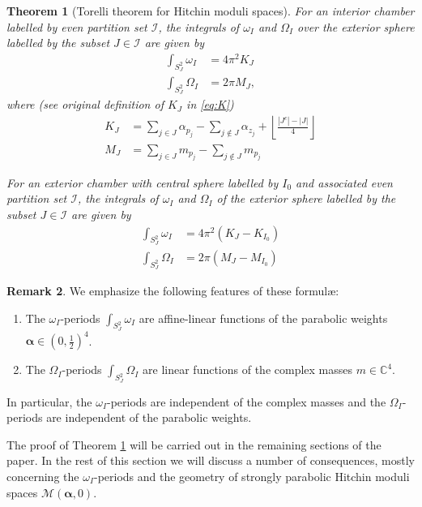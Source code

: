 \documentclass[12pt,letterpaper,reqno]{amsart}
\def\mathbf#1{#1}%
\newtheorem{thm}{Theorem}
\theoremstyle{remark}
\theoremstyle{definition}
\newtheorem{rem}[thm]{Remark}
\numberwithin{thm}{section}
\numberwithin{equation}{section}
\numberwithin{figure}{section}
\newcommand{\cM}{\ensuremath{\mathcal M}}
\newcommand{\C}{\ensuremath{\mathbb C}}
\begin{document}
\begin{thm}[Torelli theorem for Hitchin moduli spaces] \label{thm:Torelli}
For an interior chamber labelled by even partition set $\mathcal{I}$, the integrals of $\omega_I$ and $\Omega_I$ over the exterior sphere labelled by the subset $J \in \mathcal{I}$ are given by 
\begin{align}\label{eq:Torelli1}\int_{S^2_J} \omega_I &= 4 \pi^2 K_J\\ \nonumber
\int_{S^2_J} \Omega_I &= 2 \pi M_J,
\end{align}
where (see original definition of $K_J$ in \eqref{eq:K})
\begin{align}\label{eq:Torelli2}K_J &= \sum_{j \in J} \alpha_{p_j} -\sum_{j \notin J} \alpha_{z_j} + \left \lfloor \frac{|J^c| - |J|}{4} \right\rfloor\\ \nonumber
M_J &= \sum_{j \in J} m_{p_j} -\sum_{j \notin J} m_{p_j}
\end{align}

For an exterior chamber with central sphere labelled by $I_0$ and associated even partition set $\mathcal{I}$, the integrals of $\omega_I$ and $\Omega_I$ of the exterior sphere labelled by the subset $J \in \mathcal{I}$ are given by 
\begin{align}\label{eq:Torelli3}
\int_{S^2_J} \omega_I &= 4 \pi^2 \left(K_J- K_{I_0} \right)\\ \nonumber
\int_{S^2_J} \Omega_I &= 2 \pi \left(M_J- M_{I_0}\right)
\end{align}
\end{thm}

\begin{rem}
We emphasize the following features of these formul\ae:
\begin{enumerate}
\item The $\omega_I$-periods $\int_{S^2_J} \omega_I$ are affine-linear functions of the parabolic weights $\boldsymbol{\alpha} \in  (0, \frac 12 )^4$.
\item The $\Omega_I$-periods $\int_{S^2_J} \Omega_I$ are linear functions of the complex masses $\mathbf{m} \in  \C^4$. 	
\end{enumerate}
	In particular, the $\omega_I$-periods are independent of the complex masses and the $\Omega_I$-periods are independent of the parabolic weights.
\end{rem}
 
The proof of Theorem \ref{thm:Torelli} will be carried out in the remaining sections of the paper. In the rest of this section we will discuss a number of consequences, mostly concerning the $\omega_I$-periods and the geometry of strongly parabolic Hitchin moduli spaces $\cM(\boldsymbol{\alpha}, \mathbf{0})$.
 
\end{document}
